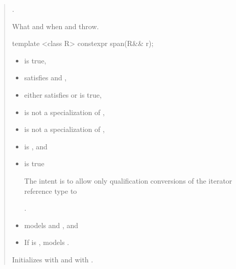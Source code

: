 \documentclass{wg21}
\begin{document}
\begin{quote}
\begin{removedblock}
\begin{itemdescr}
\pnum
\ensures
{}.

\pnum
\throws
What and when  and  throw.
\end{itemdescr}
\end{removedblock}


\begin{addedblock}
\begin{itemdecl}
template <class R>
constexpr span(R&& r);
\end{itemdecl}
\end{addedblock}

\begin{addedblock}
\begin{itemdescr}
    \pnum
    \constraints
    \begin{itemize}
       \item {} is true,
       \item {} satisfies  and ,
       \item either  satisfies  or  is true,
       \item {} is not a specialization of ,
       \item {} is not a specialization of ,
       \item {} is , and
       \item {} is true
       \begin{note}The intent is to allow only qualification conversions of the iterator reference type to  \end{note}.
    \end{itemize}

	\expects 
	\begin{itemize}
	\item {} models  and , and
	\item If  is ,  models .
	\end{itemize}

    \pnum
    \effects Initializes  with  and  with .


\end{itemdescr}
\end{addedblock}
\end{quote}
\end{document}
